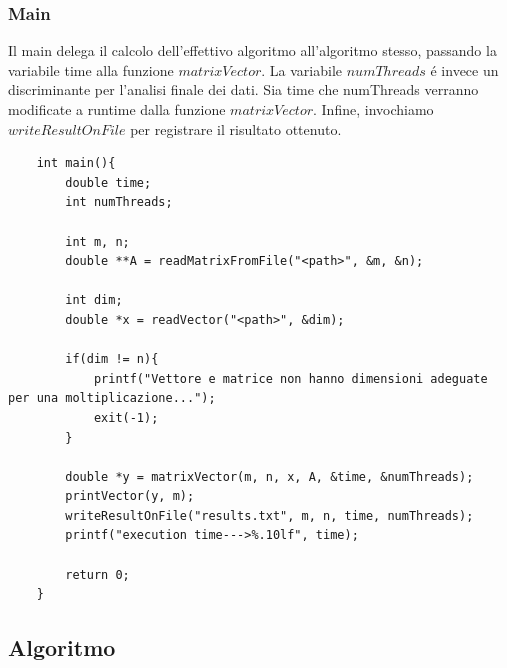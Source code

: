 \subsubsection{Main}
Il main delega il calcolo dell'effettivo algoritmo all'algoritmo stesso, passando la variabile time alla funzione $matrixVector$.
La variabile $numThreads$ é invece un discriminante per l'analisi finale dei dati.
Sia time che numThreads verranno modificate a runtime dalla funzione $matrixVector$.
Infine, invochiamo $writeResultOnFile$ per registrare il risultato ottenuto.
\begin{lstlisting}
    int main(){
        double time;
        int numThreads;

        int m, n;
        double **A = readMatrixFromFile("<path>", &m, &n);
    
        int dim;
        double *x = readVector("<path>", &dim);
    
        if(dim != n){
            printf("Vettore e matrice non hanno dimensioni adeguate per una moltiplicazione...");
            exit(-1);
        }
        
        double *y = matrixVector(m, n, x, A, &time, &numThreads);
        printVector(y, m);
        writeResultOnFile("results.txt", m, n, time, numThreads);
        printf("execution time--->%.10lf", time);
    
        return 0;
    }
\end{lstlisting}

\subsection{Algoritmo}

